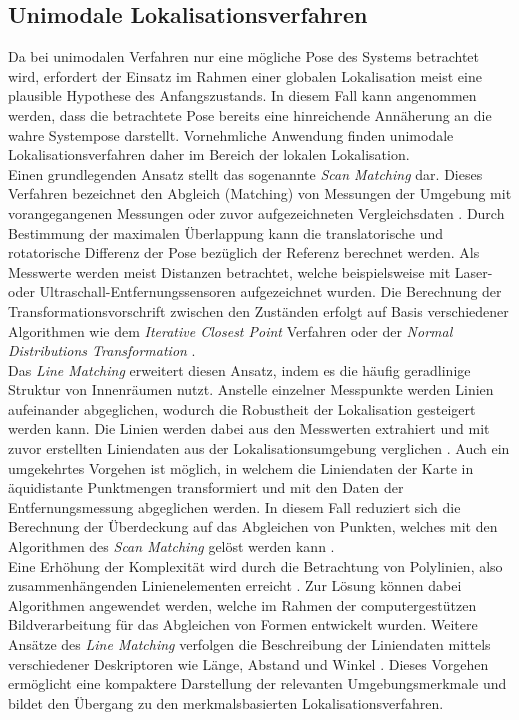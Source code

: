 \subsection{Unimodale Lokalisationsverfahren}
\label{chap.unimod}
Da bei unimodalen Verfahren nur eine mögliche Pose des Systems betrachtet wird, erfordert der Einsatz im Rahmen einer globalen Lokalisation meist eine  plausible Hypothese des Anfangszustands. In diesem Fall kann angenommen werden, dass die betrachtete Pose bereits eine hinreichende Annäherung an die wahre Systempose darstellt. Vornehmliche Anwendung finden unimodale Lokalisationsverfahren daher im Bereich der lokalen Lokalisation.\\

Einen grundlegenden Ansatz stellt das sogenannte \textit{Scan Matching} dar. Dieses Verfahren bezeichnet den Abgleich (Matching) von Messungen der Umgebung mit vorangegangenen Messungen \cite{Gutmann1996} oder zuvor aufgezeichneten Vergleichsdaten \cite{Gutmann1998}. Durch Bestimmung der maximalen Überlappung kann die translatorische und rotatorische Differenz der Pose bezüglich der Referenz berechnet werden. Als Messwerte werden meist Distanzen betrachtet, welche beispielsweise mit Laser- \cite{Diosi2007} oder Ultraschall-Entfernungssensoren \cite{Burguera2005} aufgezeichnet wurden. Die Berechnung der Transformationsvorschrift zwischen den Zuständen erfolgt auf Basis verschiedener Algorithmen wie dem \textit{Iterative Closest Point} Verfahren \cite{Besl1992}\cite{Lu1994} oder der \textit{Normal Distributions Transformation} \cite{Biber2003}.\\

Das \textit{Line Matching} erweitert diesen Ansatz, indem es die häufig geradlinige Struktur von Innenräumen nutzt. Anstelle einzelner Messpunkte werden Linien aufeinander abgeglichen, wodurch die Robustheit der Lokalisation gesteigert werden kann. Die Linien werden dabei aus den Messwerten extrahiert und mit zuvor erstellten Liniendaten aus der Lokalisationsumgebung verglichen \cite{Cox1991}\cite{Gutmann1999}. Auch ein umgekehrtes Vorgehen ist möglich, in welchem die Liniendaten der Karte in äquidistante Punktmengen transformiert und mit den Daten der Entfernungsmessung abgeglichen werden. In diesem Fall reduziert sich die Berechnung der Überdeckung auf das Abgleichen von Punkten, welches mit den Algorithmen des \textit{Scan Matching} gelöst werden kann \cite{Hertzberg2012}.\\

Eine Erhöhung der Komplexität wird durch die Betrachtung von Polylinien, also zusammenhängenden Linienelementen erreicht \cite{Wolter2004}. Zur Lösung können dabei Algorithmen angewendet werden, welche im Rahmen der computergestützen Bildverarbeitung für das Abgleichen von Formen entwickelt wurden. Weitere Ansätze des \textit{Line Matching} verfolgen die Beschreibung der Liniendaten mittels verschiedener Deskriptoren wie Länge, Abstand und Winkel \cite{Frey2014}\cite{Garulli2005}. Dieses Vorgehen ermöglicht eine kompaktere Darstellung der relevanten Umgebungsmerkmale und bildet den Übergang zu den merkmalsbasierten Lokalisationsverfahren.\\

